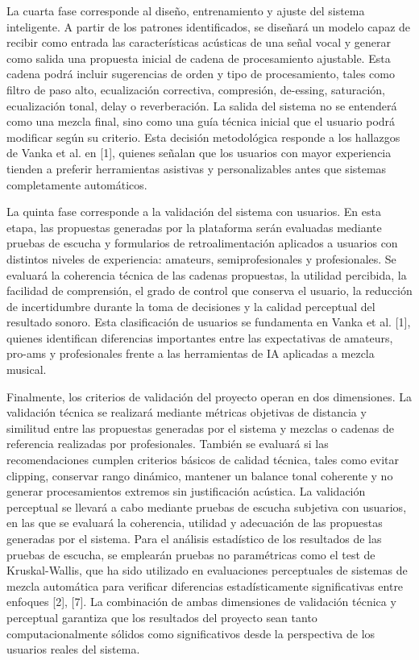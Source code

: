 La cuarta fase corresponde al diseño, entrenamiento y ajuste del sistema inteligente. A partir de los patrones identificados, se diseñará un modelo capaz de recibir como entrada las características acústicas de una señal vocal y generar como salida una propuesta inicial de cadena de procesamiento ajustable. Esta cadena podrá incluir sugerencias de orden y tipo de procesamiento, tales como filtro de paso alto, ecualización correctiva, compresión, de-essing, saturación, ecualización tonal, delay o reverberación. La salida del sistema no se entenderá como una mezcla final, sino como una guía técnica inicial que el usuario podrá modificar según su criterio. Esta decisión metodológica responde a los hallazgos de Vanka et al. en [1], quienes señalan que los usuarios con mayor experiencia tienden a preferir herramientas asistivas y personalizables antes que sistemas completamente automáticos.

La quinta fase corresponde a la validación del sistema con usuarios. En esta etapa, las propuestas generadas por la plataforma serán evaluadas mediante pruebas de escucha y formularios de retroalimentación aplicados a usuarios con distintos niveles de experiencia: amateurs, semiprofesionales y profesionales. Se evaluará la coherencia técnica de las cadenas propuestas, la utilidad percibida, la facilidad de comprensión, el grado de control que conserva el usuario, la reducción de incertidumbre durante la toma de decisiones y la calidad perceptual del resultado sonoro. Esta clasificación de usuarios se fundamenta en Vanka et al. [1], quienes identifican diferencias importantes entre las expectativas de amateurs, pro-ams y profesionales frente a las herramientas de IA aplicadas a mezcla musical.

Finalmente, los criterios de validación del proyecto operan en dos dimensiones. La validación técnica se realizará mediante métricas objetivas de distancia y similitud entre las propuestas generadas por el sistema y mezclas o cadenas de referencia realizadas por profesionales. También se evaluará si las recomendaciones cumplen criterios básicos de calidad técnica, tales como evitar clipping, conservar rango dinámico, mantener un balance tonal coherente y no generar procesamientos extremos sin justificación acústica. La validación perceptual se llevará a cabo mediante pruebas de escucha subjetiva con usuarios, en las que se evaluará la coherencia, utilidad y adecuación de las propuestas generadas por el sistema. Para el análisis estadístico de los resultados de las pruebas de escucha, se emplearán pruebas no paramétricas como el test de Kruskal-Wallis, que ha sido utilizado en evaluaciones perceptuales de sistemas de mezcla automática para verificar diferencias estadísticamente significativas entre enfoques [2], [7]. La combinación de ambas dimensiones de validación técnica y perceptual garantiza que los resultados del proyecto sean tanto computacionalmente sólidos como significativos desde la perspectiva de los usuarios reales del sistema.

